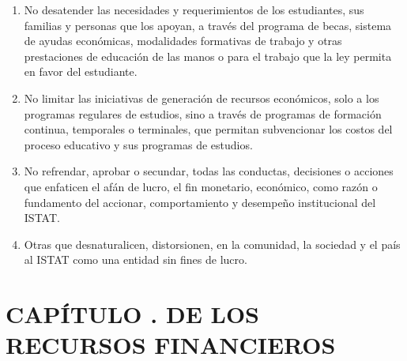 \begin{enumerate}
\item No desatender las necesidades y requerimientos de los estudiantes, sus familias y personas que los apoyan, a través del programa de becas, sistema de ayudas económicas, modalidades formativas de trabajo y otras prestaciones de educación de las manos o para el trabajo que la ley permita en favor del estudiante. 
\item No limitar las iniciativas de generación de recursos económicos, solo a los programas regulares de estudios, sino a través de programas de formación continua, temporales o terminales, que permitan subvencionar los costos del proceso educativo y sus programas de estudios. 
\item No refrendar, aprobar o secundar, todas las conductas, decisiones o acciones que enfaticen el afán de lucro, el fin monetario, económico, como razón o fundamento del accionar, comportamiento y desempeño institucional del ISTAT. 
\item Otras que desnaturalicen, distorsionen, en la comunidad, la sociedad y el país al ISTAT como una entidad sin fines de lucro. 
\end{enumerate}
\section{CAPÍTULO . DE LOS RECURSOS FINANCIEROS}
\addtocounter{re}{1}

